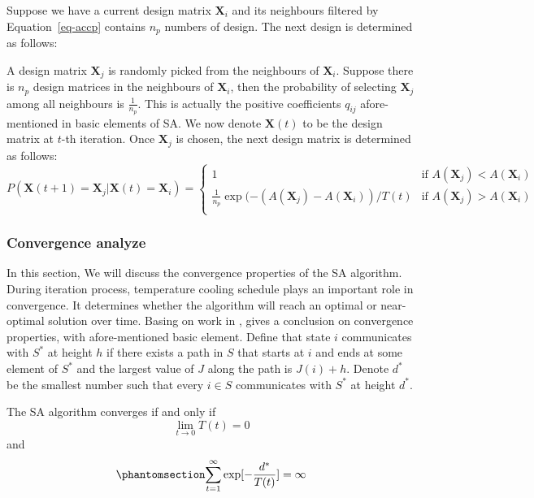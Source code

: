 \documentclass[
  a4paper,
  oneside,
  openany,
  12pt,
  onecolumn]{book}
\theoremstyle{definition}
\theoremstyle{plain}
\theoremstyle{remark}
\begin{document}
Suppose we have a current design matrix \(\boldsymbol{X}_i\) and its
neighbours filtered by Equation~\ref{eq-accp} contains \(n_p\) numbers
of design. The next design is determined as follows:

A design matrix \(\boldsymbol{X}_j\) is randomly picked from the
neighbours of \(\boldsymbol{X}_i\). Suppose there is \(n_p\) design
matrices in the neighbours of \(\boldsymbol{X}_i\), then the probability
of selecting \(\boldsymbol{X}_j\) among all neighbours is
\(\frac{1}{n_p}\). This is actually the positive coefficients \(q_{ij}\)
afore-mentioned in basic elements of SA. We now denote
\(\boldsymbol{X}(t)\) to be the design matrix at \(t\)-th iteration.
Once \(\boldsymbol{X}_j\) is chosen, the next design matrix is
determined as follows: \[
P(\boldsymbol{X}(t+1)=\boldsymbol{X}_j|\boldsymbol{X}(t)=\boldsymbol{X}_i)
=\begin{cases}
1 & \text{if } A(\boldsymbol{X}_j)<A(\boldsymbol{X}_i) \\
\frac{1}{n_p}\exp(-(A(\boldsymbol{X}_j)-A(\boldsymbol{X}_i))/T(t) & \text{if } A(\boldsymbol{X}_j)>A(\boldsymbol{X}_i)\\
\end{cases}
\]

\subsubsection{Convergence analyze}\label{convergence-analyze}

In this section, We will discuss the convergence properties of the SA
algorithm. During iteration process, temperature cooling schedule plays
an important role in convergence. It determines whether the algorithm
will reach an optimal or near-optimal solution over time. Basing on work
in \citet{sasaki1988time}, \citet{bertsimas1993simulated} gives a
conclusion on convergence properties, with afore-mentioned basic
element. Define that state \(i\) communicates with \(S^*\) at height
\(h\) if there exists a path in \(S\) that starts at \(i\) and ends at
some element of \(S^*\) and the largest value of \(J\) along the path is
\(J(i)+h\). Denote \(d^*\) be the smallest number such that every
\(i \in S\) communicates with \(S^*\) at height \(d^*\).

The SA algorithm converges if and only if \[
\lim_{t\to 0} T(t)=0
\] and \begin{equation}\phantomsection\label{eq-covcon}{
\sum_{t=1}^{\infty} \exp[-\frac{d^*}{T(t)}]=\infty
}\end{equation}
\end{document}
